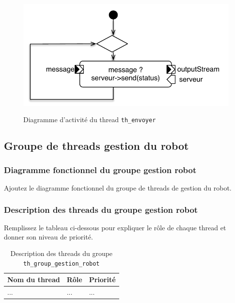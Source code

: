 \documentclass[11pt, a4paper]{paper}
\begin{document}
\begin{figure}[htbp]
\label{fig:act_envoyer}
\begin{center}
{\includegraphics[scale=.5]{./figures-pdf/act_envoyer}}
{\caption{Diagramme d'activité du thread {\tt th\_envoyer}}}
\end{center}
\end{figure}
\FloatBarrier

\subsection{Groupe de threads gestion du robot}

\subsubsection{Diagramme fonctionnel du groupe gestion robot}
{\color{blue} Ajoutez le diagramme fonctionnel du groupe de threads de gestion du robot.}

\subsubsection{Description des threads du groupe gestion robot}
{\color{red} Remplissez le tableau ci-dessous pour expliquer le rôle de chaque thread et donner son niveau de priorité.}


\begin{table}[htp]
\caption{Description des threads du groupe {\tt th\_group\_gestion\_robot}}
\begin{center}
\begin{tabular}{|p{3cm}|p{8.5cm}|p{2cm}|}
\hline
\bf Nom du thread &	\bf Rôle &	\bf Priorité \\
\hline
\hline
\color{blue}... &	\color{blue}... &	\color{blue}...\\
\hline
\end{tabular}
\end{center}
\label{tab:gt_moniteur}
\end{table}%
\FloatBarrier
\end{document}
